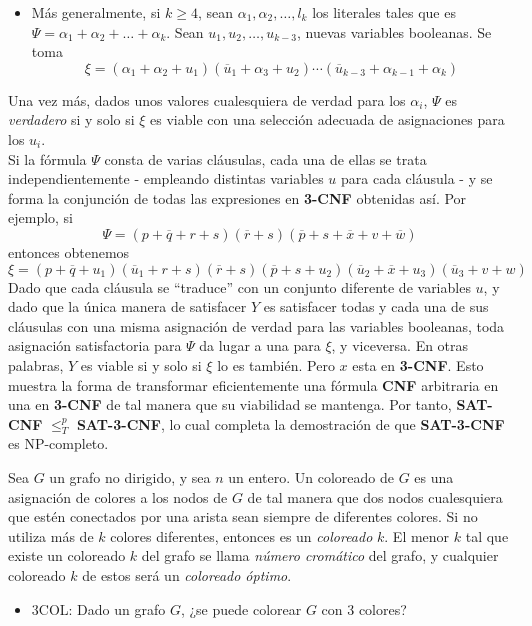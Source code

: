 \begin{itemize}
\item Más generalmente, si $k \geq 4$, sean $\alpha_1, \alpha_2, \ldots, l_k$ los literales tales que es $\Psi = \alpha_1 + \alpha_2 + \ldots + \alpha_k$. Sean $u_1, u_2, \ldots, u_{k-3}$, nuevas variables booleanas. Se toma
\[ \xi = (\alpha_1 + \alpha_2 + u_1)(\overline{u}_1 + \alpha_3 + u_2) \cdots (\overline{u}_{k-3} + \alpha_{k-1} + \alpha_k) \]
\end{itemize}

Una vez más, dados unos valores cualesquiera de verdad para los $\alpha_i$, $\Psi$ es \emph{verdadero} si y solo si $\xi$ es viable con una selección adecuada de asignaciones para los $u_i$.\\
Si la fórmula $\Psi$ consta de varias cláusulas, cada una de ellas se trata independientemente - empleando distintas variables $u$ para cada cláusula - y se forma la conjunción de todas las expresiones en \textbf{3-CNF} obtenidas así. Por ejemplo, si
\[ \Psi = (p + \overline{q} + r + s)(\overline{r} + s)(\overline{p} + s + \overline{x} + v + \overline{w}) \]
entonces obtenemos
\[ \xi = (p + \overline{q} + u_1)(\overline{u}_1 + r + s)(\overline{r} + s)(\overline{p} + s + u_2)(\overline{u}_2 + \overline{x} + u_3)(\overline{u}_3 + v + w) \]
Dado que cada cláusula se ``traduce'' con un conjunto diferente de variables $u$, y dado que la única manera de satisfacer $Y$ es satisfacer todas y cada una de sus cláusulas con una misma asignación de verdad para las variables booleanas, toda asignación satisfactoria para $\Psi$ da lugar a una para $\xi$, y viceversa. En otras palabras, $Y$ es viable si y solo si $\xi$ lo es también. Pero $x$ esta en \textbf{3-CNF}. Esto muestra la forma de transformar eficientemente una fórmula \textbf{CNF} arbitraria en una en \textbf{3-CNF} de tal manera que su viabilidad se mantenga. Por tanto, \textbf{SAT-CNF} $\leq _{T}^p$ \textbf{SAT-3-CNF}, lo cual completa la demostración de que \textbf{SAT-3-CNF} es NP-completo.\\

\begin{fondo}
Sea $G$ un grafo no dirigido, y sea $n$ un entero. Un coloreado de $G$ es una asignación de colores a los nodos de $G$ de tal manera que dos nodos cualesquiera que estén conectados por una arista sean siempre de diferentes colores. Si no utiliza más de $k$ colores diferentes, entonces es un \emph{coloreado} $k$. El menor $k$ tal que existe un coloreado $k$ del grafo se llama \emph{número cromático} del grafo, y cualquier coloreado $k$ de estos será un \emph{coloreado óptimo}.
\end{fondo}
\begin{itemize}
\item 3COL: Dado un grafo $G$, ¿se puede colorear $G$ con 3 colores?
\end{itemize}

